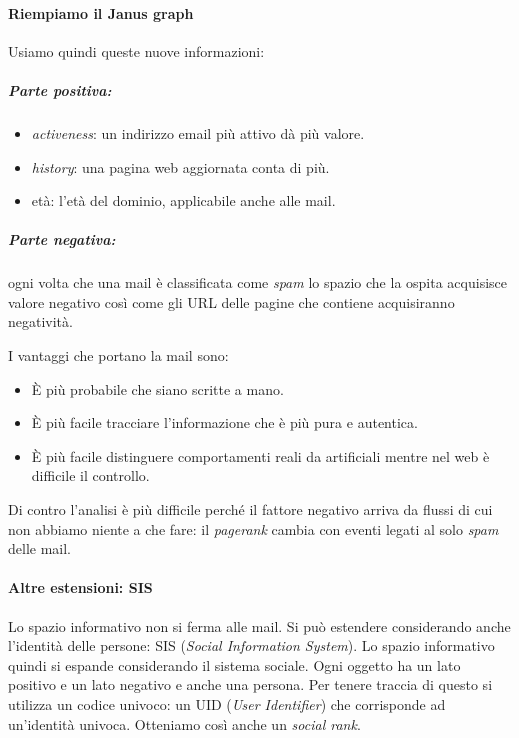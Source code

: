 					
				\paragraph{Riempiamo il Janus graph}
				Usiamo quindi queste nuove informazioni:
						\subparagraph{Parte positiva:}
							\begin{itemize}
								\item \emph{activeness}: un indirizzo email più attivo dà più valore.
								\item \emph{history}: una pagina web aggiornata conta di più.
								\item età: l'età del dominio, applicabile anche alle mail.
							\end{itemize}
						\subparagraph{Parte negativa:} ogni volta che una mail è classificata come \emph{spam} lo spazio che la ospita acquisisce valore negativo così come gli URL delle pagine che contiene acquisiranno negatività.
					
					I vantaggi che portano la mail sono:
					\begin{itemize}
						\item È più probabile che siano scritte a mano.
						\item È più facile tracciare l'informazione che è più pura e autentica.
						\item È più facile distinguere comportamenti reali da artificiali mentre nel web è difficile il controllo.
					\end{itemize}
					Di contro l'analisi è più difficile perché il fattore negativo arriva da flussi di cui non abbiamo niente a che fare: il \emph{pagerank} cambia con eventi legati al solo \emph{spam} delle mail.
					
				
				\paragraph{Altre estensioni: SIS}
					Lo spazio informativo non si ferma alle mail. Si può estendere considerando anche l'identità delle persone: SIS (\emph{Social Information System}).
					Lo spazio informativo quindi si espande considerando il sistema sociale. Ogni oggetto ha un lato positivo e un lato negativo e anche una persona. Per tenere traccia di questo si utilizza un codice univoco: un UID (\emph{User Identifier}) che corrisponde ad un'identità univoca. Otteniamo così anche un \emph{social rank}.
					
